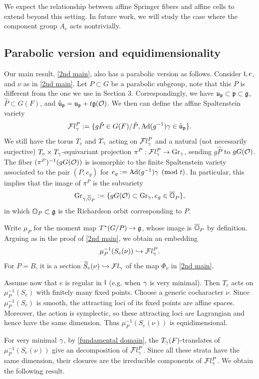 \documentclass[11pt]{article}
\numberwithin{equation}{section}
\begin{document}
We expect the relationship between affine Springer fibers and affine cells to extend beyond this setting. In future work, we will study the case where the component group $A_e$ acts nontrivially.

\subsection{Parabolic version and equidimensionality}
Our main result, \cref{2nd main}, also has a parabolic version as follows. Consider $\mathfrak{l},e$, and $\nu$ as in \cref{2nd main}. Let $P\subset G$ be a parabolic subgroup, note that this $P$ is different from the one we use in Section 3. Correspondingly, we have $\mathfrak{u}_{\mathfrak{p}}\subset \mathfrak{p}\subset \mathfrak{g}$, $\hat{P}\subset G(F)$, and $\hat{\mathfrak{u}}_{\mathfrak{p}}= \mathfrak{u}_{\mathfrak{p}}+ t\mathfrak{g}(\mathcal{O})$. We then can define the affine Spaltenstein variety 
$$\mathcal{F}l_\gamma^P:= \{g\hat{P}\in G(F)/\hat{P}, \operatorname{Ad}(g^{-1})\gamma\in \hat{\mathfrak{u}}_{\mathfrak{p}}\}.$$
We still have the torus $T_e$ and $T_\gamma$ acting on $\mathcal{F}l_\gamma^P$ and a natural (not necessarily surjective) $T_e\times T_\gamma$-equivariant projection $\pi^P: \mathcal{F}l_\gamma^P\to \operatorname{Gr}_\gamma$, sending $g\hat{P}$ to $gG(\mathcal{O})$. The fiber $(\pi^P)^{-1}(gG(\mathcal{O}))$ is isomorphic to the finite Spaltenstein variety associated to the pair $(P, e_g)$ for $e_g:= \operatorname{Ad}(g^{-1})\gamma \pmod{t}$. In particular, this implies that the image of $\pi^P$ is the subvariety
$$\operatorname{Gr}_{\gamma,\overline{\mathbb{O}}_P}:= \{gG(\mathcal{O})\subset \operatorname{Gr}_\gamma, e_g\in \overline{\mathbb{O}}_P\},$$
in which $\mathbb{O}_P\subset \mathfrak{g}$ is the Richardson orbit corresponding to $P$. 

Write $\mu_P$ for the moment map $T^*(G/P)\to\mathfrak{g}$, whose image is $\overline{\mathbb{O}}_P$
by definition. Arguing as in the proof of \cref{2nd main}, we obtain an embedding
\[
\mu_P^{-1}(S_e(\nu))\hookrightarrow \mathcal{F}l_\gamma^P.
\]
For $P=B$, it is a section $\widetilde S_e(\nu)\hookrightarrow\mathcal{F}l_\gamma$ of the map $\Phi_\nu$ in
\cref{2nd main}. 

Assume now that $e$ is regular in $\mathfrak{l}$ (e.g. when $\gamma$ is very minimal). Then $T_e$ acts on $\mu_P^{-1}(S_e)$ with finitely
many fixed points. Choose a generic cocharacter $\nu$.
Since $\mu_P^{-1}(S_e)$ is smooth, the attracting loci of its fixed points are affine spaces.
Moreover, the action is symplectic, so these attracting
loci are Lagrangian and hence have the same dimension.
Thus $\mu_P^{-1}(S_e(\nu))$ is equidimensional.

For very minimal $\gamma$, by \cref{fundamental domain},
the $T_\gamma(F)$-translates of $\mu_P^{-1}(S_e(\nu))$
give an decomposition of $\mathcal{F}l_\gamma^P$.
Since all these strata have the same dimension,
their closures are the irreducible components of
$\mathcal{F}l_\gamma^P$. We obtain the following result.
\end{document}
